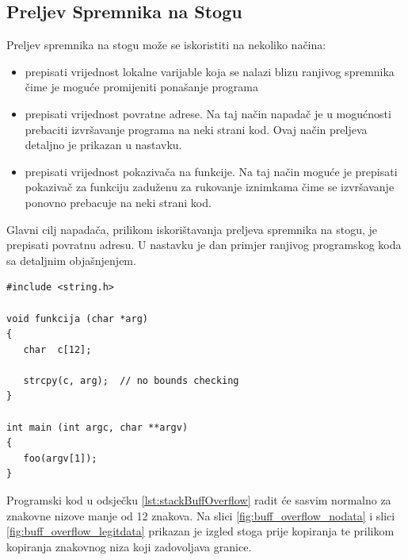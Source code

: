 \documentclass[times, utf8, diplomski, numeric]{fer}
\begin{document}
\subsection{Preljev Spremnika na Stogu}

Preljev spremnika na stogu može se iskoristiti na nekoliko
načina:

\begin{itemize}
\item prepisati vrijednost lokalne varijable koja se nalazi blizu
ranjivog spremnika čime je moguće promijeniti ponašanje programa
\item prepisati vrijednost povratne adrese. Na taj način napadač
je u mogućnosti prebaciti izvršavanje programa na neki strani
kod. Ovaj način preljeva detaljno je prikazan u nastavku.
\item prepisati vrijednost pokazivača na funkcije. Na taj način
moguće je prepisati pokazivač za funkciju zaduženu za rukovanje
iznimkama čime se izvršavanje ponovno prebacuje na neki strani
kod.
\end{itemize}

Glavni cilj napadača, prilikom iskorištavanja preljeva spremnika
na stogu, je prepisati povratnu adresu. U nastavku je dan primjer
ranjivog programskog koda sa detaljnim objašnjenjem.

\begin{lstlisting}[frame=single, caption=Primjer preljeva spremnika na stogu, label={lst:stackBuffOverflow}]
#include <string.h>
 
void funkcija (char *arg)
{
   char  c[12];
 
   strcpy(c, arg);  // no bounds checking
}
 
int main (int argc, char **argv)
{
   foo(argv[1]);
}
\end{lstlisting}

Programski kod u odsječku \ref{lst:stackBuffOverflow} radit će
sasvim normalno za znakovne nizove manje od 12 znakova. Na slici
\ref{fig:buff_overflow_nodata} i slici
\ref{fig:buff_overflow_legitdata} prikazan je izgled stoga prije
kopiranja te prilikom kopiranja znakovnog niza koji zadovoljava
granice.
\end{document}
